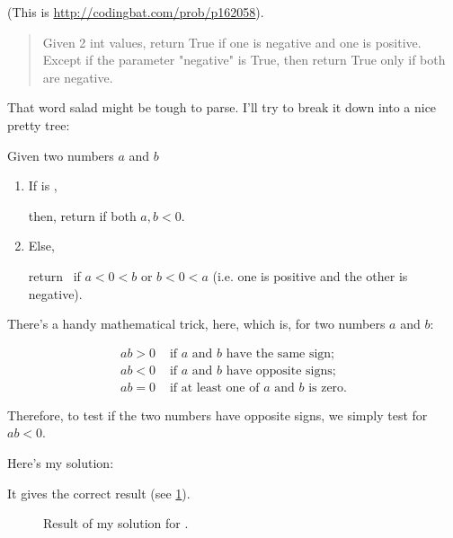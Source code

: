 \begin{example}
  (This is \url{http://codingbat.com/prob/p162058}).

  \begin{quotation}
    Given 2 int values, return True if one is negative and one is
    positive. Except if the parameter "negative" is True, then return
    True only if both are negative.
  \end{quotation}

  \begin{solution}
    That word salad might be tough to parse. I'll try to break it down
    into a nice pretty tree:

    Given two numbers $a$ and $b$

    \begin{enumerate}
    \item If  is \True ,

      then, return \True if both $a, b < 0$.
    \item Else,

      return \True\ if $a < 0 < b$ or $b < 0 < a$ (i.e. one is
      positive and the other is negative).
    \end{enumerate}

    There's a handy mathematical trick, here, which is, for two
    numbers $a$ and $b$:

    \begin{align*}
      ab > 0 & \text{ if $a$ and $b$ have the same sign;} \\
      ab < 0 & \text{ if $a$ and $b$ have opposite signs;} \\
      ab = 0 & \text{ if at least one of $a$ and $b$ is zero.}
    \end{align*}

    Therefore, to test if the two numbers have opposite signs, we
    simply test for $ab < 0$.

    Here's my solution:


    It gives the correct result (see \cref{fig:pos_neg}).
  \end{solution}
\end{example}

\begin{figure}[h]
  \centering
  \caption{Result of my solution for .}
  \label{fig:pos_neg}
\end{figure}

